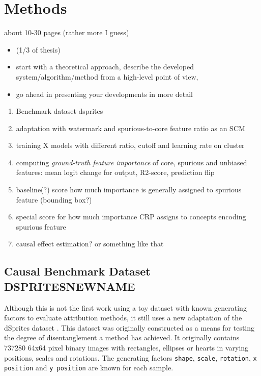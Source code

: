 \chapter{Methods}\label{chapter:method}

{ \color{red}

    about 10-30 pages (rather more I guess)

    \begin{itemize}
        \item (1/3 of thesis)
        \item start with a theoretical approach, describe the developed system/algorithm/method from a high-level point of view,
        \item go ahead in presenting your developments in more detail
    \end{itemize}
}


\begin{enumerate}
    \item Benchmark dataset dsprites
    \item adaptation with watermark and spurious-to-core feature ratio as an SCM
    \item training X models with different ratio, cutoff and learning rate on cluster
    \item computing \textit{ground-truth feature importance} of core, spurious and unbiased features: mean logit change for output, R2-score,  prediction flip
    \item baseline(?) score how much importance is generally assigned to spurious feature (bounding box?)
    \item special score for how much importance CRP assigns to concepts encoding spurious feature
    \item causal effect estimation? or something like that
\end{enumerate}


\section{Causal Benchmark Dataset DSPRITESNEWNAME}
Although this is not the first work using a toy dataset with known generating factors to evaluate attribution methods, it still uses a new adaptation of the dSprites dataset \cite{dsprites17}. This dataset was originally constructed as a means for testing the degree of disentanglement a method has achieved. It originally contains 737280 64x64 pixel binary images with rectangles, ellipses or hearts in varying positions, scales and rotations. The generating factors \verb|shape|, \verb|scale|, \verb|rotation|, \verb|x position| and \verb|y position| are known for each sample.

